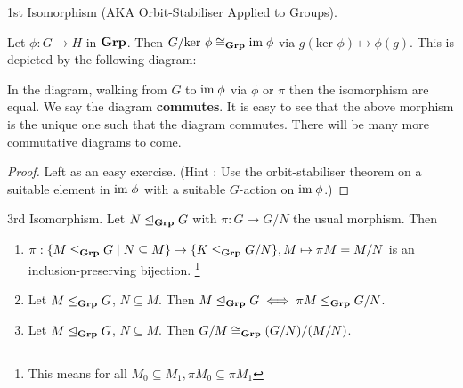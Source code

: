 \documentclass[../../book.tex]{subfiles}
\begin{document}
\begin{thm} 1st Isomorphism (AKA Orbit-Stabiliser Applied to Groups). 
    
    Let $\phi : G \to H$ in $\mathbf{Grp}$. 
    Then $G / \text{ker } \phi \cong_{\mathbf{Grp}} \textnormal{im}\; \phi$ 
    via $g(\text{ker }\phi) \mapsto \phi(g)$.
    This is depicted by the following diagram:
    \begin{figure}[ht]
        \centering
    \end{figure}
    In the diagram, walking from $G$ to $\textnormal{im}\; \phi$ via 
    $\phi$ or $\pi$ then the isomorphism are equal. 
    We say the diagram \textbf{commutes}. 
    It is easy to see that the above morphism is the unique one
    such that the diagram commutes. 
    There will be many more commutative diagrams to come. 
\end{thm}
\begin{proof}
    Left as an easy exercise. 
    (Hint : Use the orbit-stabiliser theorem
    on a suitable element in $\textnormal{im}\; \phi$ with a suitable $G$-action on $\textnormal{im}\; \phi$.)
\end{proof}
\begin{thm} 3rd Isomorphism. 
    Let $N \trianglelefteq_{\mathbf{Grp}} G$ with $\pi : G \to G/N$ the usual morphism. Then
    \begin{enumerate}
        \item $\pi : 
        \{M \leq_{\mathbf{Grp}} G \mid N \subseteq M\} \to \{K \leq_{\mathbf{Grp}} G/N\}, 
        M \mapsto \pi M = M/N$ is an inclusion-preserving bijection.
        \footnote{This means for all $M_0\subseteq M_1,
        \pi M_0 \subseteq \pi M_1$}
        \item Let $M \leq_{\mathbf{Grp}} G$, $N \subseteq M$. 
        Then $M \trianglelefteq_{\mathbf{Grp}} G \iff \pi M \trianglelefteq_{\mathbf{Grp}} G/N$. 
        \item Let $M \trianglelefteq_{\mathbf{Grp}} G$, $N \subseteq M$. 
        Then $G / M \cong_{\mathbf{Grp}} (G / N) / (M / N)$. 
    \end{enumerate}
    
\end{thm}
\end{document}
